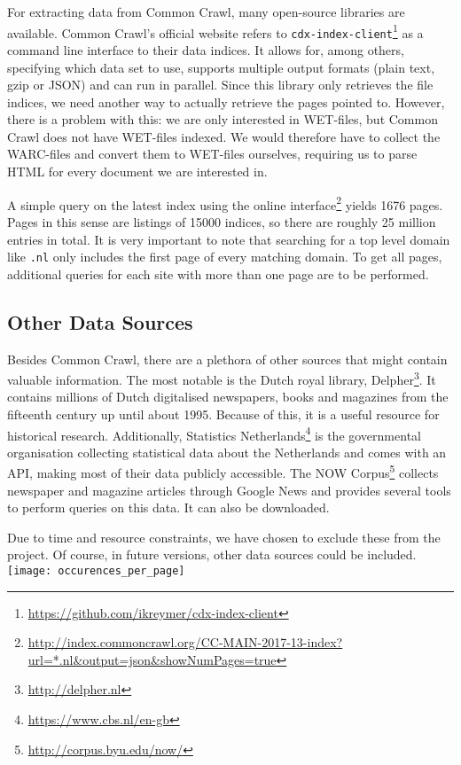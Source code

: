 For extracting data from Common Crawl, many open-source libraries are available. Common Crawl's official website refers to \texttt{cdx-index-client}\footnote{\url{https://github.com/ikreymer/cdx-index-client}} as a command line interface to their data indices. It allows for, among others, specifying which data set to use, supports multiple output formats (plain text, gzip or JSON) and can run in parallel. Since this library only retrieves the file indices, we need another way to actually retrieve the pages pointed to. However, there is a problem with this: we are only interested in WET-files, but Common Crawl does not have WET-files indexed. We would therefore have to collect the WARC-files and convert them to WET-files ourselves, requiring us to parse HTML for every document we are interested in.

A simple query on the latest index using the online interface\footnote{\url{http://index.commoncrawl.org/CC-MAIN-2017-13-index?url=*.nl&output=json&showNumPages=true}} yields 1676 pages. Pages in this sense are listings of 15000 indices, so there are roughly 25 million entries in total. It is very important to note that searching for a top level domain like \texttt{.nl} only includes the first page of every matching domain. To get all pages, additional queries for each site with more than one page are to be performed.


\subsection{Other Data Sources}\label{sec:delpher}
Besides Common Crawl, there are a plethora of other sources that might contain valuable information. The most notable is the Dutch royal library, Delpher\footnote{\url{http://delpher.nl}}. It contains millions of Dutch digitalised newspapers, books and magazines from the fifteenth century up until about 1995. Because of this, it is a useful resource for historical research. Additionally, Statistics Netherlands\footnote{\url{https://www.cbs.nl/en-gb}} is the governmental organisation collecting statistical data about the Netherlands and comes with an API, making most of their data publicly accessible. The NOW Corpus\footnote{\url{http://corpus.byu.edu/now/}} collects newspaper and magazine articles through Google News and provides several tools to perform queries on this data. It can also be downloaded. 

Due to time and resource constraints, we have chosen to exclude these from the project. Of course, in future versions, other data sources could be included.\\



\texttt{[image: occurences\_per\_page]}


